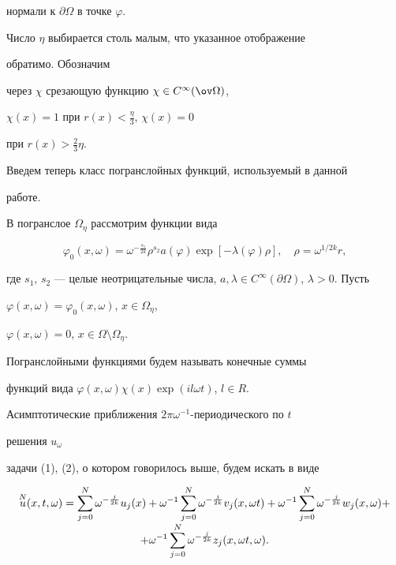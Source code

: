 нормали к $\partial\Omega$ в точке $\varphi$. 


Число $\eta$ выбирается столь малым, что указанное отображение 


обратимо. Обозначим 


через $\chi$ срезающую функцию $\chi\in C^\infty(\ov\Omega)$, 


$\chi(x)=1$ при $r(x)<\frac{\eta}{3}$, $\chi(x)=0$ 


при $r(x)>\frac{2}{3}\eta$. 


 


Введем теперь класс погранслойных функций, используемый в данной 


работе.  


В погранслое $\Omega_\eta$ рассмотрим функции вида 


$$ 


\varphi_0(x,\omega)=\omega^{-\frac{s_1}{2k}}\rho^{s_2}a(\varphi) 


\exp[-\lambda(\varphi)\rho],\quad \rho=\omega^{1/2k}r, 


$$ 


где $s_1$, $s_2$ --- целые неотрицательные числа, $a,\lambda\in 


C^\infty(\partial\Omega)$, $\lambda>0$. Пусть  


$\varphi(x,\omega)=\varphi_0(x,\omega)$, $x\in \Omega_\eta$, 


$\varphi(x,\omega)=0$, $x\in\Omega\setminus\Omega_\eta$. 


Погранслойными функциями будем называть конечные суммы  


функций вида $\varphi(x,\omega)\chi(x)\exp(i l\omega t)$, $l\in R$. 


 


Асимптотические приближения $2\pi\omega^{-1}$-периодического по $t$ 


решения $u_\omega$ 


задачи (1), (2), о котором говорилось выше, будем искать в виде 


\begin{multline} 


\up{N}{u}(x,t,\omega)=\sum^N_{j=0}\omega^{-\frac{j}{2k}} 


u_j(x)+\omega^{-1}\sum^N_{j=0}\omega^{-\frac{j}{2k}} 


v_j(x,\omega t)+\omega^{-1}\sum^N_{j=0} 


\omega^{-\frac{j}{2k}}w_j(x,\omega)+ \\[-1mm] +\omega^{-1} 


\sum^N_{j=0}\omega^{-\frac{j}{2k}}z_j(x,\omega t,\omega). 


\end{multline} 


